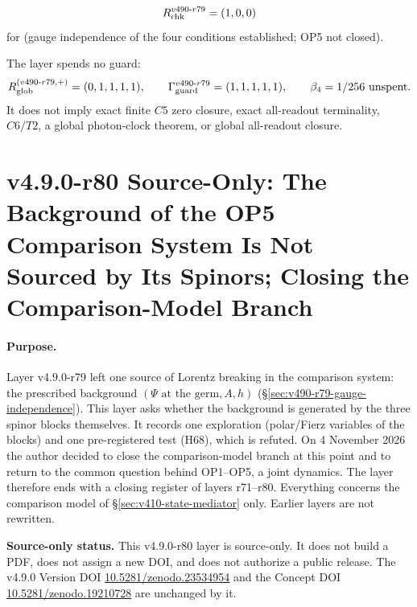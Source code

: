 \[
R_{\rm chk}^{v490\text{-}r79}=(1,0,0)
\]
for (gauge independence of the four conditions established; OP5 not closed).

The layer spends no guard:
\[
R_{\rm glob}^{(v490\text{-}r79,+)}=(0,1,1,1,1),
\qquad
\Gamma_{\rm guard}^{v490\text{-}r79}=(1,1,1,1,1),
\qquad
\beta_4=1/256\ \text{unspent}.
\]
It does not imply exact finite \(C5\) zero closure, exact all-readout terminality,
\(C6/T2\), a global photon-clock theorem, or global all-readout closure.

\clearpage
\section*{v4.9.0-r80 Source-Only: The Background of the OP5 Comparison System Is Not Sourced by Its Spinors; Closing the Comparison-Model Branch}
\label{sec:v490-r80-background-not-sourced}

\paragraph{Purpose.}
Layer v4.9.0-r79 left one source of Lorentz breaking in the comparison system: the prescribed background
\((\Psi\text{ at the germ},A,h)\) (\S\ref{sec:v490-r79-gauge-independence}).  This layer asks whether the background is
generated by the three spinor blocks themselves.  It records one exploration (polar/Fierz variables of the blocks) and one
pre-registered test (H68), which is refuted.  On 4 November 2026 the author decided to close the comparison-model branch at
this point and to return to the common question behind OP1--OP5, a joint dynamics.  The layer therefore ends with a closing
register of layers r71--r80.  Everything concerns the comparison model of \S\ref{sec:v410-state-mediator} only.  Earlier
layers are not rewritten.

\noindent\textbf{Source-only status.}
This v4.9.0-r80 layer is source-only.  It does not build a PDF, does not assign a new DOI,
and does not authorize a public release.  The v4.9.0 Version DOI
\href{https://doi.org/10.5281/zenodo.23534954}{10.5281/zenodo.23534954} and the Concept DOI
\href{https://doi.org/10.5281/zenodo.19210728}{10.5281/zenodo.19210728} are unchanged by it.

